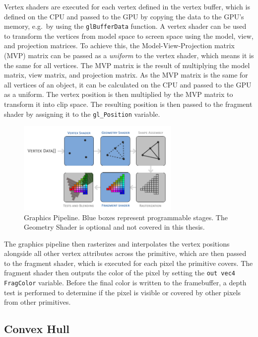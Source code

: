 Vertex shaders are executed for each vertex defined in the vertex buffer, which is defined on the CPU and
passed to the GPU by copying the data to the GPU's memory, e.g.\ by using the \texttt{glBufferData} function.
A vertex shader can be used to transform the vertices from model space to screen space using the
model, view, and projection matrices.
To achieve this, the Model-View-Projection matrix (MVP) matrix can be passed as a \textit{uniform} to the vertex shader,
which means it is the same for all vertices.
The MVP matrix is the result of multiplying the model matrix, view matrix, and projection matrix.
As the MVP matrix is the same for all vertices of an object, it can be calculated on the CPU and passed to the GPU as a uniform.
The vertex position is then multiplied by the MVP matrix to transform it into clip space.
The resulting position is then passed to the fragment shader by assigning it to the \texttt{gl\_Position} variable.

\begin{figure}[h]
    \centering
    \includegraphics[width=0.70\textwidth]{images/graphics-pipeline}
    \caption{Graphics Pipeline. Blue boxes represent programmable stages. The Geometry Shader is optional and not covered in this thesis.}
    \label{fig:graphics-pipeline}
\end{figure}


The graphics pipeline then rasterizes and interpolates the vertex positions alongside all other vertex attributes
across the primitive, which are then passed to the fragment shader, which is executed for each pixel the primitive covers.
The fragment shader then outputs the color of the pixel by setting the \texttt{out vec4 FragColor} variable.
Before the final color is written to the framebuffer,
a depth test is performed to determine if the pixel is visible or covered by other pixels from other primitives.

\subsection{Convex Hull}
\parencite{graham_efficient_1972}
\parencite{andrew_another_1979}

